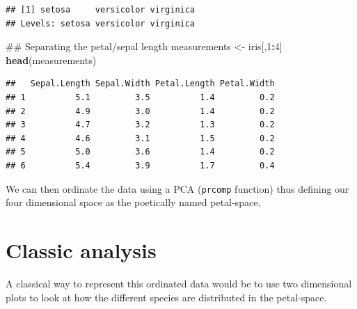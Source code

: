 \documentclass[]{book}
\newenvironment{Shaded}{\begin{snugshade}}{\end{snugshade}}
\newcommand{\KeywordTok}[1]{\textcolor[rgb]{0.13,0.29,0.53}{\textbf{#1}}}
\newcommand{\DecValTok}[1]{\textcolor[rgb]{0.00,0.00,0.81}{#1}}
\newcommand{\StringTok}[1]{\textcolor[rgb]{0.31,0.60,0.02}{#1}}
\newcommand{\OperatorTok}[1]{\textcolor[rgb]{0.81,0.36,0.00}{\textbf{#1}}}
\newcommand{\NormalTok}[1]{#1}
\theoremstyle{definition}
\theoremstyle{definition}
\theoremstyle{definition}
\theoremstyle{remark}
\begin{document}
\begin{verbatim}
## [1] setosa     versicolor virginica 
## Levels: setosa versicolor virginica
\end{verbatim}

\begin{Shaded}
\begin{Highlighting}[]
\NormalTok{## Separating the petal/sepal length}
\NormalTok{measurements <-}\StringTok{ }\NormalTok{iris[,}\DecValTok{1}\OperatorTok{:}\DecValTok{4}\NormalTok{]}
\KeywordTok{head}\NormalTok{(measurements)}
\end{Highlighting}
\end{Shaded}

\begin{verbatim}
##   Sepal.Length Sepal.Width Petal.Length Petal.Width
## 1          5.1         3.5          1.4         0.2
## 2          4.9         3.0          1.4         0.2
## 3          4.7         3.2          1.3         0.2
## 4          4.6         3.1          1.5         0.2
## 5          5.0         3.6          1.4         0.2
## 6          5.4         3.9          1.7         0.4
\end{verbatim}

We can then ordinate the data using a PCA (\texttt{prcomp} function)
thus defining our four dimensional space as the poetically named
petal-space.

\begin{Shaded}
\end{Shaded}

\section{Classic analysis}\label{classic-analysis}

A classical way to represent this ordinated data would be to use two
dimensional plots to look at how the different species are distributed
in the petal-space.
\end{document}
